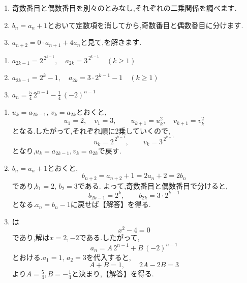   \noindent{}\par\nobreak
  \begin{enumerate}[label=(\arabic*),parsep=3pt,format=\bookitemlink{example-nonadjacent-1}{hint}{answer}]
    \item 奇数番目と偶数番目を別々のとみなし,それぞれの二乗関係を調べます.
    \item $b_n=a_n+1$とおいて定数項を消してから,奇数番目と偶数番目に分けます.
    \item $a_{n+2}=0\cdot a_{n+1}+4a_n$と見て,を解きます.
  \end{enumerate}
  
  \noindent{}\par\nobreak
  \begin{enumerate}[label=(\arabic*),parsep=3pt,format=\bookitemlink{example-nonadjacent-1}{answer}{solution}]
    \item $a_{2k-1}=2^{\,2^{k-1}},\quad a_{2k}=3^{\,2^{k-1}}\quad(k\ge1)$
    \item $a_{2k-1}=2^k-1,\quad a_{2k}=3\cdot2^{k-1}-1\quad(k\ge1)$
    \item $a_n=\frac54\,2^{n-1}-\frac14\,(-2)^{n-1}$
  \end{enumerate}
  
  \noindent{}\par\nobreak
  \begin{enumerate}[label=(\arabic*),parsep=3pt,format=\bookitemlink{example-nonadjacent-1}{solution}{problem}]
    \item $u_k=a_{2k-1},\,v_k=a_{2k}$とおくと,
      \[
        u_1=2,\quad v_1=3,\qquad
        u_{k+1}=u_k^2,\quad v_{k+1}=v_k^2
      \]
      となる.したがって,それぞれ順に2乗していくので,
      \[
        u_k=2^{\,2^{k-1}},\qquad v_k=3^{\,2^{k-1}}
      \]
      となり,$u_k=a_{2k-1},v_k=a_{2k}$で戻す.
    \item $b_n=a_n+1$とおくと,
      \[
        b_{n+2}=a_{n+2}+1=2a_n+2=2b_n
      \]
      であり,$b_1=2,\,b_2=3$である.
      よって,奇数番目と偶数番目で分けると,
      \[
        b_{2k-1}=2^k,\qquad b_{2k}=3\cdot2^{k-1}
      \]
      となる.$a_n=b_n-1$に戻せば【解答】を得る.
    \item {}は
      \[
        x^2-4=0
      \]
      であり,解は$x=2,-2$である.したがって,
      \[
        a_n=A\,2^{n-1}+B\,(-2)^{n-1}
      \]
      とおける.$a_1=1,\,a_2=3$を代入すると,
      \[
        A+B=1,\qquad 2A-2B=3
      \]
      より$A=\frac{5}{4},B=-\frac{1}{4}$と決まり,【解答】を得る.
  \end{enumerate}
  
